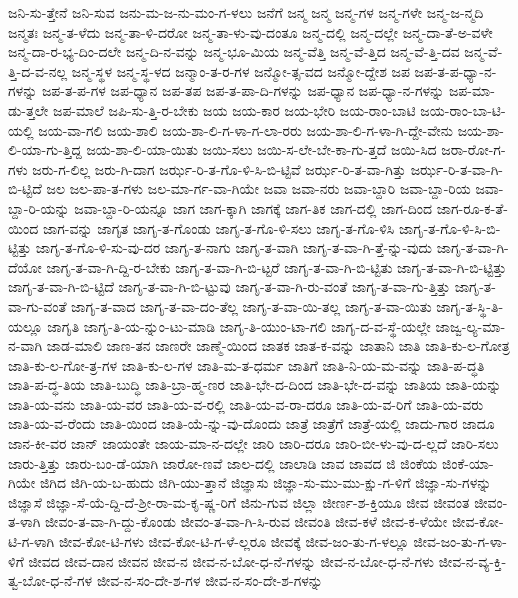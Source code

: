 {ಜನಿ-ಸು-ತ್ತೇನೆ
ಜನಿ-ಸುವ
ಜನು-ಮ-ಜ-ನು-ಮಂ-ಗ-ಳಲು
ಜನೆಗೆ
ಜನ್ಮ
ಜನ್ಮ
ಜನ್ಮ-ಗಳ
ಜನ್ಮ-ಗಳೇ
ಜನ್ಮ-ಜ-ನ್ಮದಿ
ಜನ್ಮತಃ
ಜನ್ಮ-ತ-ಳೆದು
ಜನ್ಮ-ತಾ-ಳಿ-ದರೋ
ಜನ್ಮ-ತಾ-ಳು-ವು-ದಂತೂ
ಜನ್ಮ-ದಲ್ಲಿ
ಜನ್ಮ-ದಲ್ಲೇ
ಜನ್ಮ-ದಾ-ತೆ-ಅ-ವಳೇ
ಜನ್ಮ-ದಾ-ರ-ಭ್ಯ-ದಿಂ-ದಲೇ
ಜನ್ಮ-ದಿ-ನ-ವನ್ನು
ಜನ್ಮ-ಭೂ-ಮಿಯ
ಜನ್ಮ-ವೆತ್ತಿ
ಜನ್ಮ-ವೆ-ತ್ತಿದ
ಜನ್ಮ-ವೆ-ತ್ತಿ-ದವ
ಜನ್ಮ-ವೆ-ತ್ತಿ-ದ-ವ-ನಲ್ಲ
ಜನ್ಮ-ಸ್ಥಳ
ಜನ್ಮ-ಸ್ಥ-ಳದ
ಜನ್ಮಾಂ-ತ-ರ-ಗಳ
ಜನ್ಮೋ-ತ್ಸ-ವದ
ಜನ್ಮೋ-ದ್ದೇಶ
ಜಪ
ಜಪ-ತ-ಪ-ಧ್ಯಾ-ನ-ಗಳನ್ನು
ಜಪ-ತ-ಪ-ಗಳ
ಜಪ-ಧ್ಯಾನ
ಜಪ-ತಪ
ಜಪ-ತ-ಪಾ-ದಿ-ಗಳನ್ನು
ಜಪ-ಧ್ಯಾನ
ಜಪ-ಧ್ಯಾ-ನ-ಗಳನ್ನು
ಜಪ-ಮಾ-ಡು-ತ್ತಲೇ
ಜಪ-ಮಾಲೆ
ಜಪಿ-ಸು-ತ್ತಿ-ರ-ಬೇಕು
ಜಯ
ಜಯ-ಕಾರ
ಜಯ-ಭೇರಿ
ಜಯ-ರಾಂ-ಬಾಟಿ
ಜಯ-ರಾಂ-ಬಾ-ಟಿ-ಯಲ್ಲಿ
ಜಯ-ವಾ-ಗಲಿ
ಜಯ-ಶಾಲಿ
ಜಯ-ಶಾ-ಲಿ-ಗ-ಳಾ-ಗ-ಲಾ-ರರು
ಜಯ-ಶಾ-ಲಿ-ಗ-ಳಾ-ಗಿ-ದ್ದೇ-ವೇನು
ಜಯ-ಶಾ-ಲಿ-ಯಾ-ಗು-ತ್ತಿದ್ದ
ಜಯ-ಶಾ-ಲಿ-ಯಾ-ಯಿತು
ಜಯಿ-ಸಲು
ಜಯಿ-ಸ-ಲೇ-ಬೇ-ಕಾ-ಗು-ತ್ತದೆ
ಜಯಿ-ಸಿದ
ಜರಾ-ರೋ-ಗ-ಗಳು
ಜರು-ಗ-ಲಿಲ್ಲ
ಜರು-ಗಿ-ದಾಗ
ಜರ್ಝ-ರಿ-ತ-ಗೊ-ಳಿ-ಸಿ-ಬಿ-ಟ್ಟಿವೆ
ಜರ್ಝ-ರಿ-ತ-ವಾ-ಗಿತ್ತು
ಜರ್ಝ-ರಿ-ತ-ವಾ-ಗಿ-ಬಿ-ಟ್ಟಿದೆ
ಜಲ
ಜಲ-ಪಾ-ತ-ಗಳು
ಜಲ-ಮಾ-ರ್ಗ-ವಾ-ಗಿಯೇ
ಜವಾ
ಜವಾ-ನರು
ಜವಾ-ಬ್ದಾರಿ
ಜವಾ-ಬ್ದಾ-ರಿಯ
ಜವಾ-ಬ್ದಾ-ರಿ-ಯನ್ನು
ಜವಾ-ಬ್ದಾ-ರಿ-ಯನ್ನೂ
ಜಾಗ
ಜಾಗ-ಕ್ಕಾಗಿ
ಜಾಗಕ್ಕೆ
ಜಾಗ-ತಿಕ
ಜಾಗ-ದಲ್ಲಿ
ಜಾಗ-ದಿಂದ
ಜಾಗ-ರೂ-ಕ-ತೆ-ಯಿಂದ
ಜಾಗ-ವನ್ನು
ಜಾಗೃತ
ಜಾಗೃ-ತ-ಗೊಂಡು
ಜಾಗೃ-ತ-ಗೊ-ಳಿ-ಸಲು
ಜಾಗೃ-ತ-ಗೊ-ಳಿಸಿ
ಜಾಗೃ-ತ-ಗೊ-ಳಿ-ಸಿ-ಬಿ-ಟ್ಟಿತ್ತು
ಜಾಗೃ-ತ-ಗೊ-ಳಿ-ಸು-ವು-ದರ
ಜಾಗೃ-ತ-ನಾಗು
ಜಾಗೃ-ತ-ವಾಗಿ
ಜಾಗೃ-ತ-ವಾ-ಗಿ-ತ್ತೆ-ನ್ನು-ವುದು
ಜಾಗೃ-ತ-ವಾ-ಗಿ-ದೆಯೋ
ಜಾಗೃ-ತ-ವಾ-ಗಿ-ದ್ದಿ-ರ-ಬೇಕು
ಜಾಗೃ-ತ-ವಾ-ಗಿ-ಬಿ-ಟ್ಟರೆ
ಜಾಗೃ-ತ-ವಾ-ಗಿ-ಬಿ-ಟ್ಟಿತು
ಜಾಗೃ-ತ-ವಾ-ಗಿ-ಬಿ-ಟ್ಟಿತ್ತು
ಜಾಗೃ-ತ-ವಾ-ಗಿ-ಬಿ-ಟ್ಟಿದೆ
ಜಾಗೃ-ತ-ವಾ-ಗಿ-ಬಿ-ಟ್ಟುವು
ಜಾಗೃ-ತ-ವಾ-ಗಿ-ರು-ವಂತೆ
ಜಾಗೃ-ತ-ವಾ-ಗು-ತ್ತಿತ್ತು
ಜಾಗೃ-ತ-ವಾ-ಗು-ವಂತೆ
ಜಾಗೃ-ತ-ವಾದ
ಜಾಗೃ-ತ-ವಾ-ದಂ-ತೆಲ್ಲ
ಜಾಗೃ-ತ-ವಾ-ಯಿ-ತಲ್ಲ
ಜಾಗೃ-ತ-ವಾ-ಯಿತು
ಜಾಗೃ-ತ-ಸ್ಥಿ-ತಿ-ಯಲ್ಲೂ
ಜಾಗೃತಿ
ಜಾಗೃ-ತಿ-ಯ-ನ್ನುಂ-ಟು-ಮಾಡಿ
ಜಾಗೃ-ತಿ-ಯುಂ-ಟಾ-ಗಲಿ
ಜಾಗೃ-ದ-ವ-ಸ್ಥೆ-ಯಲ್ಲೇ
ಜಾಜ್ವ-ಲ್ಯ-ಮಾ-ನ-ವಾಗಿ
ಜಾಡ-ಮಾಲಿ
ಜಾಣ-ತನ
ಜಾಣರೇ
ಜಾಣ್ಮೆ-ಯಿಂದ
ಜಾತಕ
ಜಾತ-ಕ-ವನ್ನು
ಜಾತಾನಿ
ಜಾತಿ
ಜಾತಿ-ಕು-ಲ-ಗೋತ್ರ
ಜಾತಿ-ಕು-ಲ-ಗೋ-ತ್ರ-ಗಳ
ಜಾತಿ-ಕು-ಲ-ಗಳ
ಜಾತಿ-ಮ-ತ-ಧರ್ಮ
ಜಾತಿಗೆ
ಜಾತಿ-ನಿ-ಯ-ಮ-ವನ್ನು
ಜಾತಿ-ಪ-ದ್ಧತಿ
ಜಾತಿ-ಪ-ದ್ಧ-ತಿಯ
ಜಾತಿ-ಬುದ್ಧಿ
ಜಾತಿ-ಬ್ರಾ-ಹ್ಮ-ಣರ
ಜಾತಿ-ಭೇ-ದ-ದಿಂದ
ಜಾತಿ-ಭೇ-ದ-ವನ್ನು
ಜಾತಿಯ
ಜಾತಿ-ಯನ್ನು
ಜಾತಿ-ಯ-ವನು
ಜಾತಿ-ಯ-ವರ
ಜಾತಿ-ಯ-ವ-ರಲ್ಲಿ
ಜಾತಿ-ಯ-ವ-ರಾ-ದರೂ
ಜಾತಿ-ಯ-ವ-ರಿಗೆ
ಜಾತಿ-ಯ-ವರು
ಜಾತಿ-ಯ-ವ-ರೆಂದು
ಜಾತಿ-ಯಿಂದ
ಜಾತಿ-ಯೆ-ನ್ನು-ವು-ದೊಂದು
ಜಾತ್ರೆ
ಜಾತ್ರೆಗೆ
ಜಾತ್ರೆ-ಯಲ್ಲಿ
ಜಾದು-ಗಾರ
ಜಾದೂ
ಜಾನ-ಕೀ-ವರ
ಜಾನ್
ಜಾಯಂತೇ
ಜಾಯ-ಮಾ-ನ-ದಲ್ಲೇ
ಜಾರಿ
ಜಾರಿ-ದರೂ
ಜಾರಿ-ಬೀ-ಳು-ವು-ದ-ಲ್ಲದೆ
ಜಾರಿ-ಸಲು
ಜಾರು-ತ್ತಿತ್ತು
ಜಾರು-ಬಂ-ಡೆ-ಯಾಗಿ
ಜಾರೋ-ಣವೆ
ಜಾಲ-ದಲ್ಲಿ
ಜಾಲಾಡಿ
ಜಾವ
ಜಾವದ
ಜಿ
ಜಿಂಕೆಯ
ಜಿಂಕೆ-ಯಾ-ಗಿಯೇ
ಜಿಗಿದ
ಜಿಗಿ-ಯ-ಬ-ಹುದು
ಜಿಗಿ-ಯು-ತ್ತಾನೆ
ಜಿಜ್ಞಾಸು
ಜಿಜ್ಞಾ-ಸು-ಮು-ಮು-ಕ್ಷು-ಗ-ಳಿಗೆ
ಜಿಜ್ಞಾ-ಸು-ಗಳನ್ನು
ಜಿಜ್ಞಾಸೆ
ಜಿಜ್ಞಾ-ಸೆ-ಯೆ-ದ್ದಿ-ದೆ-ಶ್ರೀ-ರಾ-ಮ-ಕೃ-ಷ್ಣ-ರಿಗೆ
ಜಿನು-ಗುವ
ಜಿಲ್ಲಾ
ಜೀರ್ಣ-ಶ-ಕ್ತಿಯೂ
ಜೀವ
ಜೀವಂತ
ಜೀವಂ-ತ-ಳಾಗಿ
ಜೀವಂ-ತ-ವಾ-ಗಿ-ದ್ದು-ಕೊಂಡು
ಜೀವಂ-ತ-ವಾ-ಗಿ-ಸಿ-ರುವ
ಜೀವಂತಿ
ಜೀವ-ಕಳೆ
ಜೀವ-ಕ-ಳೆಯೇ
ಜೀವ-ಕೋ-ಟಿ-ಗ-ಳಾಗಿ
ಜೀವ-ಕೋ-ಟಿ-ಗಳು
ಜೀವ-ಕೋ-ಟಿ-ಗ-ಳೆ-ಲ್ಲರೂ
ಜೀವಕ್ಕೆ
ಜೀವ-ಜಂ-ತು-ಗ-ಳಲ್ಲೂ
ಜೀವ-ಜಂ-ತು-ಗ-ಳಾ-ಳಿಗೆ
ಜೀವದ
ಜೀವ-ದಾನ
ಜೀವನ
ಜೀವ-ನ
ಜೀವ-ನ-ಬೋ-ಧ-ನೆ-ಗಳನ್ನು
ಜೀವ-ನ-ಬೋ-ಧ-ನೆ-ಗಳು
ಜೀವ-ನ-ವ್ಯ-ಕ್ತಿ-ತ್ವ-ಬೋ-ಧ-ನೆ-ಗಳ
ಜೀವ-ನ-ಸಂ-ದೇ-ಶ-ಗಳ
ಜೀವ-ನ-ಸಂ-ದೇ-ಶ-ಗಳನ್ನು
}
